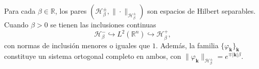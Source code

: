             \begin{theorem}\label{thm:Hbetahilbert}
                Para cada $\beta \in \mathbb{R}$, los pares $(\mathcal{H}_\beta^\pm, \|\cdot\|_{\mathcal{H}_\beta^\pm})$ son espacios de Hilbert separables. Cuando $\beta > 0$ se tienen las inclusiones continuas
                \begin{equation*}
                    \mathcal{H}_\beta^- \hookrightarrow L^2(\mathbb{R}^n) \hookrightarrow \mathcal{H}_\beta^+,
                \end{equation*}
                con normas de inclusión menores o iguales que $1$. Además, la familia $\{\varphi_{\boldsymbol{k}}\}_{\boldsymbol{k}}$ constituye un sistema ortogonal completo en ambos, con $\|\varphi_{\boldsymbol{k}}\|_{\mathcal{H}_\beta^\pm} = e^{\mp|\boldsymbol{k}|\beta}$.
            \end{theorem}
